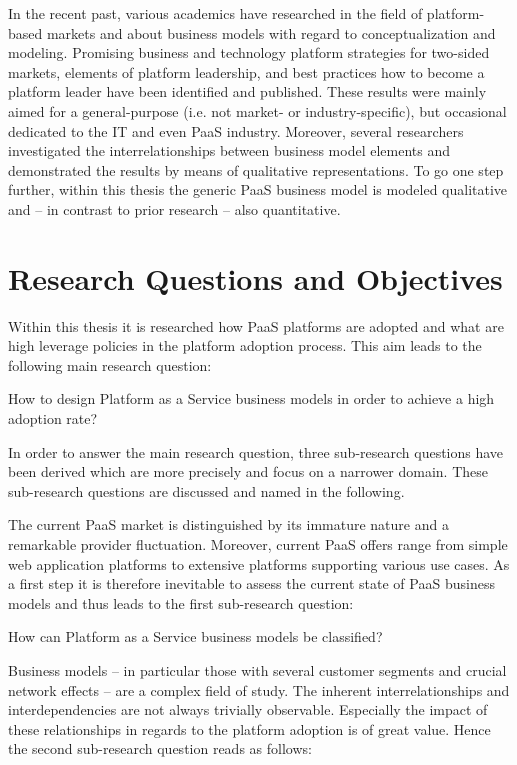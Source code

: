 In the recent past, various academics have researched in the field of platform-based markets and about business models with regard to conceptualization and modeling. Promising business and technology platform strategies for two-sided markets, elements of platform leadership, and best practices how to become a platform leader have been identified and published. These results were mainly aimed for a general-purpose (i.e. not market- or industry-specific), but occasional dedicated to the \ac{IT} and even \ac{PaaS} industry. Moreover, several researchers investigated the interrelationships between business model elements and demonstrated the results by means of qualitative representations. To go one step further, within this thesis the generic \ac{PaaS} business model is modeled qualitative and -- in contrast to prior research -- also quantitative.

\section{Research Questions and Objectives}\label{ch:intro:rq}

Within this thesis it is researched how \ac{PaaS} platforms are adopted and what are high leverage policies in the platform adoption process. This aim leads to the following main research question:

\begin{MRQ}\label{mrq}
How to design Platform as a Service business models in order to achieve a high adoption rate?
\end{MRQ}

In order to answer the main research question, three sub-research questions have been derived which are more precisely and focus on a narrower domain. These sub-research questions are discussed and named in the following.

The current \ac{PaaS} market is distinguished by its immature nature and a remarkable provider fluctuation. Moreover, current \ac{PaaS} offers range from simple web application platforms to extensive platforms supporting various use cases. As a first step it is therefore inevitable to assess the current state of \ac{PaaS} business models and thus leads to the first sub-research question:

\begin{SRQ}\label{srq1}
How can Platform as a Service business models be classified?
\end{SRQ}

Business models -- in particular those with several customer segments and crucial network effects -- are a complex field of study. The inherent interrelationships and interdependencies are not always trivially observable. Especially the impact of these relationships in regards to the platform adoption is of great value. Hence the second sub-research question reads as follows:

